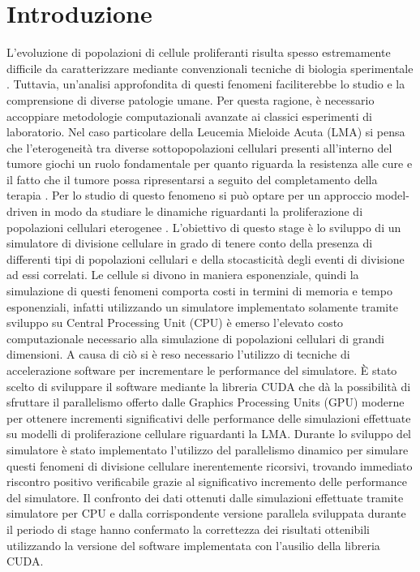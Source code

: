 
\chapter{Introduzione} %

\label{Introduzione} %



L’evoluzione di popolazioni di cellule proliferanti risulta spesso estremamente
difficile da caratterizzare mediante convenzionali tecniche di biologia
sperimentale \cite{aml2018unimib}. Tuttavia, un’analisi approfondita di questi fenomeni
faciliterebbe lo studio e la comprensione di diverse patologie umane.
Per questa ragione, è necessario accoppiare metodologie computazionali 
avanzate ai classici esperimenti di laboratorio. Nel caso particolare della 
Leucemia Mieloide Acuta (LMA) si pensa che l'eterogeneità tra diverse 
sottopopolazioni cellulari presenti all'interno del tumore giochi un ruolo 
fondamentale per quanto riguarda la resistenza alle cure e il fatto che il 
tumore possa ripresentarsi a seguito del completamento della terapia \cite{aml2018unimib}.
Per lo studio di questo fenomeno si può optare per un approccio model-driven 
in modo da studiare le dinamiche riguardanti la proliferazione di 
popolazioni cellulari eterogenee \cite{aml2018unimib}. 
L'obiettivo di questo stage è lo sviluppo di un 
simulatore di divisione cellulare in grado di tenere conto della presenza 
di differenti tipi di popolazioni cellulari e della stocasticità degli eventi
di divisione ad essi correlati. Le cellule si divono in maniera esponenziale, 
quindi la simulazione di questi fenomeni comporta costi in termini di memoria 
e tempo esponenziali, infatti utilizzando un simulatore implementato 
solamente tramite sviluppo su Central Processing Unit (CPU) 
è emerso l'elevato costo 
computazionale necessario alla simulazione di popolazioni cellulari di grandi 
dimensioni. A causa di ciò si è reso necessario 
l'utilizzo di tecniche di accelerazione software per incrementare le 
performance del simulatore. È stato scelto di sviluppare il software 
mediante la libreria CUDA che dà la possibilità di sfruttare il parallelismo 
offerto dalle Graphics Processing Units (GPU) moderne per ottenere incrementi 
significativi delle performance delle simulazioni effettuate su modelli di 
proliferazione cellulare riguardanti la LMA.
Durante lo sviluppo del simulatore è stato implementato l'utilizzo del 
parallelismo dinamico per simulare questi fenomeni 
di divisione cellulare inerentemente ricorsivi, trovando immediato riscontro 
positivo verificabile grazie al significativo incremento delle performance 
del simulatore. Il confronto dei dati ottenuti dalle simulazioni effettuate
tramite simulatore per CPU e dalla corrispondente versione parallela 
sviluppata durante il periodo di stage hanno confermato la correttezza dei
risultati ottenibili utilizzando la versione del software implementata con
l'ausilio della libreria CUDA.
